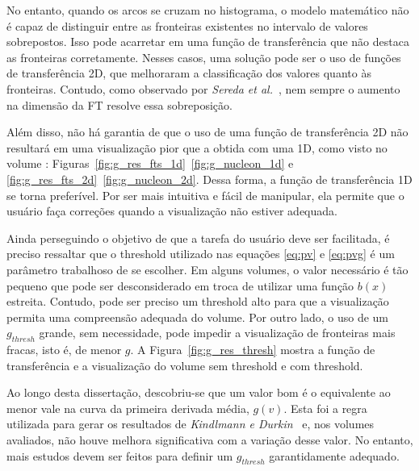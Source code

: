 	No entanto, quando os arcos se cruzam no histograma, o modelo matemático não é capaz de distinguir entre as fronteiras existentes no intervalo de valores sobrepostos. Isso pode acarretar em uma função de transferência que não destaca as fronteiras corretamente. Nesses casos, uma solução pode ser o uso de funções de transferência 2D, que melhoraram a classificação dos valores quanto às fronteiras. Contudo, como observado por \textit{Sereda et al.}~\cite{sereda1}, nem sempre o aumento na dimensão da FT resolve essa sobreposição.
	
	Além disso, não há garantia de que o uso de uma função de transferência 2D não resultará em uma visualização pior que a obtida com uma 1D, como visto no volume : Figuras~\ref{fig:g_res_fts_1d}~\ref{fig:g_nucleon_1d} e \ref{fig:g_res_fts_2d}~\ref{fig:g_nucleon_2d}. Dessa forma, a função de transferência 1D se torna preferível. Por ser mais intuitiva e fácil de manipular, ela permite que o usuário faça correções quando a visualização não estiver adequada.
	
	Ainda perseguindo o objetivo de que a tarefa do usuário deve ser facilitada, é preciso ressaltar que o threshold utilizado nas equações \eqref{eq:pv} e \eqref{eq:pvg} é um parâmetro trabalhoso de se escolher. Em alguns volumes, o valor necessário é tão pequeno que pode ser desconsiderado em troca de utilizar uma função $ b(x) $ estreita. Contudo, pode ser preciso um threshold alto para que a visualização permita uma compreensão adequada do volume. Por outro lado, o uso de um $ g_{thresh} $ grande, sem necessidade, pode impedir a visualização de fronteiras mais fracas, isto é, de menor $ g $. A Figura~\ref{fig:g_res_thresh} mostra a função de transferência e a visualização do volume  sem threshold e com threshold.
	
	Ao longo desta dissertação, descobriu-se que um valor bom é o equivalente ao menor vale na curva da primeira derivada média, $ g(v) $. Esta foi a regra utilizada para gerar os resultados de \textit{Kindlmann e Durkin}~\cite{gordon} e, nos volumes avaliados, não houve melhora significativa com a variação desse valor. No entanto, mais estudos devem ser feitos para definir um $ g_{thresh} $ garantidamente adequado.
	
